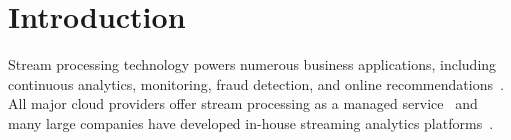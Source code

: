 \section{Introduction}\label{sec:intro}

Stream processing technology powers numerous business applications, including continuous analytics, monitoring, fraud detection, and online recommendations~\cite{dayarathna2018recent,carbone2020beyond}. All major cloud providers offer stream processing as a managed service~\cite{aws-kinesis,azure-streams,alibaba,google-dataflow} and many large companies have developed in-house streaming analytics platforms~\cite{chen2016realtime,mei2020turbine,kulkarni2015twitter,floratou2017dhalion,noghabi2017samza}. 


